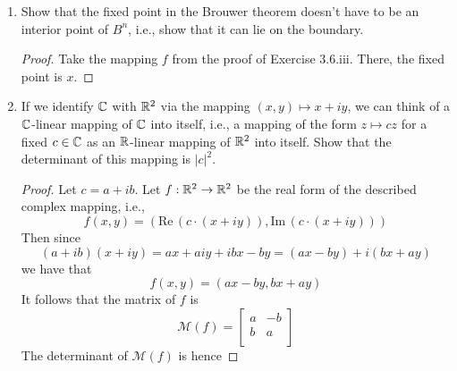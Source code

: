 \documentclass[../psets.tex]{subfiles}
\begin{document}
\begin{enumerate}[label={\textbf{3.6.\roman*.}}]
\begin{proof}
        It appears that taking the hint will not suffice to prove the claim. After all, proving that there exist continuous mappings $h:U\to\R^n$ with no fixed point will not negate the modified Brouwer fixed point theorem; we would need to find a continuous mapping $f:U\to U$ with no fixed points. Fortunately, this is not hard to do --- let $x=(1,0,\dots,0)\in\R^n$ and choose $f:U\to U$ defined by the rule "take every $p\in U$ to the midpoint of the line $\overline{px}$." This is clearly a continuous mapping of $U\to U$ with no fixed points.
    \end{proof}
    \item Show that the fixed point in the Brouwer theorem doesn't have to be an interior point of $B^n$, i.e., show that it can lie on the boundary.
    \begin{proof}
        Take the mapping $f$ from the proof of Exercise 3.6.iii. There, the fixed point is $x$.
    \end{proof}
    \item If we identify $\mathbb{C}$ with $\mathbb{R}^2$ via the mapping $(x,y)\mapsto x+iy$, we can think of a $\mathbb{C}$-linear mapping of $\mathbb{C}$ into itself, i.e., a mapping of the form $z\mapsto cz$ for a fixed $c\in\mathbb{C}$ as an $\mathbb{R}$-linear mapping of $\mathbb{R}^2$ into itself. Show that the determinant of this mapping is $|c|^2$.
    \begin{proof}
        Let $c=a+ib$. Let $f:\mathbb{R}^2\to\mathbb{R}^2$ be the real form of the described complex mapping, i.e.,
        \begin{equation*}
            f(x,y) = (\text{Re}\,(c\cdot(x+iy)),\text{Im}\,(c\cdot(x+iy)))
        \end{equation*}
        Then since
        \begin{equation*}
            (a+ib)(x+iy) = ax+aiy+ibx-by
            = (ax-by)+i(bx+ay)
        \end{equation*}
        we have that
        \begin{equation*}
            f(x,y) = (ax-by,bx+ay)
        \end{equation*}
        It follows that the matrix of $f$ is
        \begin{equation*}
            \mathcal{M}(f) =
            \begin{bmatrix}
                a & -b\\
                b & a\\
            \end{bmatrix}
        \end{equation*}
        The determinant of $\mathcal{M}(f)$ is hence

\end{proof}
\end{enumerate}
\end{document}
